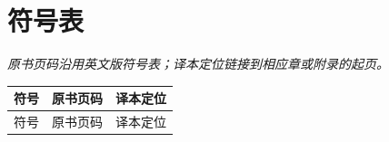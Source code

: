 
\chapter*{符号表}
\noindent\emph{原书页码沿用英文版符号表；译本定位链接到相应章或附录的起页。}\par\medskip

\begingroup
\small
\setlength{\tabcolsep}{3pt}
\newcommand{\symitem}[3]{#1 & #2 & #3 \\}
\begin{longtable}{@{}p{.68\linewidth}p{.13\linewidth}p{.13\linewidth}@{}}
\toprule 符号 & 原书页码 & 译本定位\\\midrule
\endfirsthead
\toprule 符号 & 原书页码 & 译本定位\\\midrule
\endhead



\end{longtable}
\endgroup
